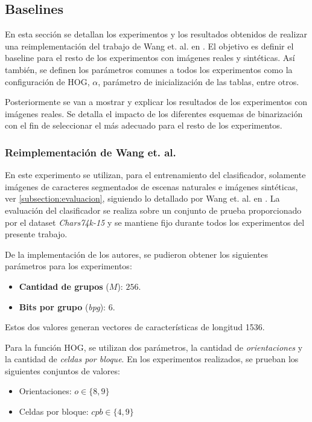 \subsection{Baselines}
\label{subsection:baseline}

	En esta sección se detallan los experimentos y los resultados obtenidos de realizar una reimplementación del trabajo de Wang et. al. en \cite{wang}. El objetivo es definir el baseline para el resto de los experimentos con imágenes reales y sintéticas. Así también, se definen los parámetros comunes a todos los experimentos como la configuración de HOG, $\alpha$, parámetro de inicialización de las tablas, entre otros.
	
	Posteriormente se van a mostrar y explicar los resultados de los experimentos con imágenes reales. Se detalla el impacto de los diferentes esquemas de binarización con el fin de seleccionar el más adecuado para el resto de los experimentos.
	
	
\subsubsection{Reimplementación de Wang et. al.}

	En este experimento se utilizan, para el entrenamiento del clasificador, solamente imágenes de caracteres segmentados de escenas naturales e imágenes sintéticas, ver \ref{subsection:evaluacion}, siguiendo lo detallado por Wang et. al. en \cite{wang}. La evaluación del clasificador se realiza sobre un conjunto de prueba proporcionado por el dataset \textit{Chars74k-15} y se mantiene fijo durante todos los experimentos del presente trabajo.
	
	De la implementación de los autores, se pudieron obtener los siguientes parámetros para los experimentos:
	\begin{itemize}
		\item \textbf{Cantidad de grupos} ($M$): $256$.
		\item \textbf{Bits por grupo} (\textit{bpg}): $6$.
	\end{itemize}
	
	Estos dos valores generan vectores de características de longitud 1536.
	
	Para la función HOG,	 se utilizan dos parámetros, la cantidad de \textit{orientaciones} y la cantidad de \textit{celdas por bloque}. En los experimentos realizados, se prueban los siguientes conjuntos de valores:
	
	\begin{itemize}
		\item Orientaciones: $\textit{o} \in \{8, 9\}$
		\item Celdas por bloque: $\textit{cpb} \in \{4, 9\}$
	\end{itemize}
	
